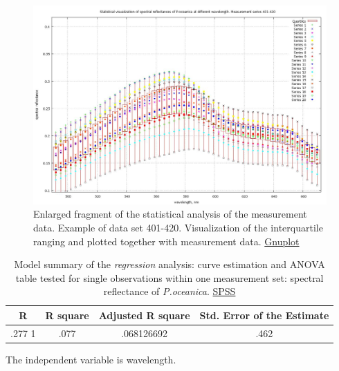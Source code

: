 \documentclass[10pt, a4paper]{article}
\begin{document}
\begin{appendices}
\begin{figure}[h]
\begin{center}
		\label{fig:A.13}
	\end{center}
\end{figure}
\begin{figure}[H]
	\begin{center}
		\includegraphics[scale=0.20]{GNU-enlarged-M-401-420.jpg}
		\caption{Enlarged fragment of the statistical analysis of the measurement data. Example of data set 401-420. 
		Visualization of the interquartile ranging and plotted together with measurement data. \href{http://www.gnuplot.info/}{Gnuplot}}
		\label{fig:A.14}
	\end{center}
\end{figure}
\pagebreak

\begin{table}[htbp]
	\caption{Model summary of the \textit{regression} analysis: curve estimation and ANOVA table tested for single observations within one measurement set: spectral reflectance of \textit{P.oceanica}. \href{http://www.spss.com/}{SPSS}}
	\begin{center}
		\begin{tabular}{|c|c|c|c|}
			\hline\hline
			\textbf{R} & \textbf{R square} & \textbf{Adjusted R square} & \textbf{Std. Error of the Estimate} \\ \hline\hline
			.277 1 & .077 & .068126692 & .462 \\ \hline
		\end{tabular}
	\end{center}
	The independent variable is wavelength. 
	\label{tab:5}
\end{table}


\end{appendices}
\end{document}
